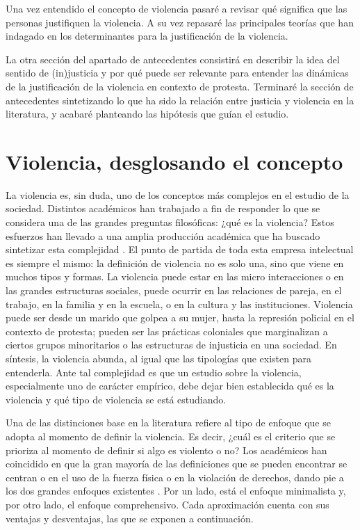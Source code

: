 \documentclass[12pt,twoside]{templates/facsothesis}
\begin{document}
Una vez entendido el concepto de violencia pasaré a revisar qué significa que las personas justifiquen la violencia. A su vez repasaré las principales teorías que han indagado en los determinantes para la justificación de la violencia.

La otra sección del apartado de antecedentes consistirá en describir la idea del sentido de (in)justicia y por qué puede ser relevante para entender las dinámicas de la justificación de la violencia en contexto de protesta. Terminaré la sección de antecedentes sintetizando lo que ha sido la relación entre justicia y violencia en la literatura, y acabaré planteando las hipótesis que guían el estudio.

\hypertarget{violencia-desglosando-el-concepto}{%
\section{Violencia, desglosando el concepto}\label{violencia-desglosando-el-concepto}}

La violencia es, sin duda, uno de los conceptos más complejos en el estudio de la sociedad. Distintos académicos han trabajado a fin de responder lo que se considera una de las grandes preguntas filosóficas: ¿qué es la violencia? Estos esfuerzos han llevado a una amplia producción académica que ha buscado sintetizar esta complejidad \citep[e.g.][]{Kurt2008, Heitmeyer2005, Bufacchi2009a}. El punto de partida de toda esta empresa intelectual es siempre el mismo: la definición de violencia no es solo una, sino que viene en muchos tipos y formas. La violencia puede estar en las micro interacciones o en las grandes estructuras sociales, puede ocurrir en las relaciones de pareja, en el trabajo, en la familia y en la escuela, o en la cultura y las instituciones. Violencia puede ser desde un marido que golpea a su mujer, hasta la represión policial en el contexto de protesta; pueden ser las prácticas coloniales que marginalizan a ciertos grupos minoritarios o las estructuras de injusticia en una sociedad. En síntesis, la violencia abunda, al igual que las tipologías que existen para entenderla. Ante tal complejidad es que un estudio sobre la violencia, especialmente uno de carácter empírico, debe dejar bien establecida qué es la violencia y qué tipo de violencia se está estudiando.

Una de las distinciones base en la literatura refiere al tipo de enfoque que se adopta al momento de definir la violencia. Es decir, ¿cuál es el criterio que se prioriza al momento de definir si algo es violento o no? Los académicos han coincidido en que la gran mayoría de las definiciones que se pueden encontrar se centran o en el uso de la fuerza física o en la violación de derechos, dando pie a los dos grandes enfoques existentes \citep{Bufacchi2005}. Por un lado, está el enfoque minimalista y, por otro lado, el enfoque comprehensivo. Cada aproximación cuenta con sus ventajas y desventajas, las que se exponen a continuación.
\end{document}
